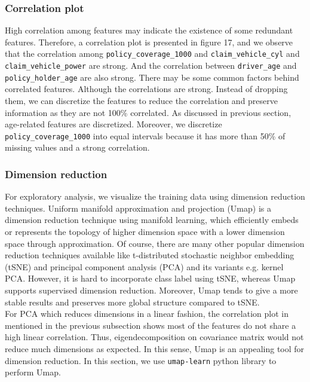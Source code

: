 \documentclass[12pt]{article}
\begin{document}
\vspace{-0.5cm}
\subsubsection*{Correlation plot}

High correlation among features may indicate the existence of some redundant features. Therefore, a correlation plot is presented in figure 17, and we observe that the correlation among \texttt{policy\_coverage\_1000} and \texttt{claim\_vehicle\_cyl} and \texttt{claim\_vehicle\_power} are strong. And the correlation between \texttt{driver\_age} and \texttt{policy\_holder\_age} are also strong. There may be some common factors behind correlated features. Although the correlations are strong. Instead of dropping them, we can discretize the features to reduce the correlation and preserve information as they are not 100\% correlated. As discussed in previous section, age-related features are discretized. Moreover, we discretize \texttt{policy\_coverage\_1000} into equal intervals because it has more than 50\% of missing values and a strong correlation.


\subsubsection*{Dimension reduction}

For exploratory analysis, we visualize the training data using dimension reduction techniques. Uniform manifold approximation and projection (Umap) is a dimension reduction technique using manifold learning, which efficiently embeds or represents the topology of higher dimension space with a lower dimension space through approximation. Of course, there are many other popular dimension reduction techniques available like t-distributed stochastic neighbor embedding (tSNE) and principal component analysis (PCA) and its variants e.g. kernel PCA. However, it is hard to incorporate class label using tSNE, whereas Umap supports supervised dimension reduction. Moreover, Umap tends to give a more stable results and preserves more global structure compared to tSNE. \\

For PCA which reduces dimensions in a linear fashion, the correlation plot in mentioned in the previous subsection shows most of the features do not share a high linear correlation. Thus, eigendecomposition on covariance matrix would not reduce much dimensions as expected. In this sense, Umap is an appealing tool for dimension reduction. In this section, we use \texttt{umap-learn} python library to perform Umap.
\end{document}
